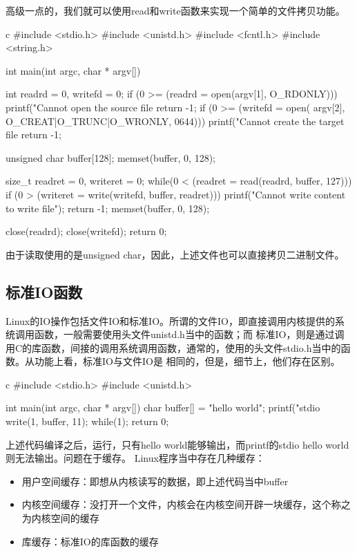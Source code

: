 高级一点的，我们就可以使用read和write函数来实现一个简单的文件拷贝功能。
\begin{code-block}{c}
#include <stdio.h>
#include <unistd.h>
#include <fcntl.h>
#include <string.h>

int main(int argc, char * argv[])
{
        int readrd = 0, writefd = 0;
        if (0 >= (readrd = open(argv[1], O_RDONLY)))
        {
                printf("Cannot open the source file %
                return -1;
        }
        if (0 >= (writefd = open(
                argv[2], O_CREAT|O_TRUNC|O_WRONLY, 0644)))
        {
                printf("Cannot create the target file %
                return -1;
        }

        unsigned char buffer[128];
        memset(buffer, 0, 128);

        size_t readret = 0, writeret = 0;
        while(0 < (readret = read(readrd, buffer, 127)))
        {
                if (0 > (writeret = write(writefd, buffer, readret)))
                {
                        printf("Cannot write content to write file\n");
                        return -1;
                }
                memset(buffer, 0, 128);
        }

        close(readrd);
        close(writefd);
        return 0;
}
\end{code-block}

由于读取使用的是unsigned char，因此，上述文件也可以直接拷贝二进制文件。

\subsection{标准IO函数}
Linux的IO操作包括文件IO和标准IO。所谓的文件IO，即直接调用内核提供的系统调用函数，一般需要使用头文件unistd.h当中的函数；而
标准IO，则是通过调用C的库函数，间接的调用系统调用函数，通常的，使用的头文件stdio.h当中的函数。从功能上看，标准IO与文件IO是
相同的，但是，细节上，他们存在区别。
\begin{code-block}{c}
#include <stdio.h>
#include <unistd.h>

int main(int argc, char * argv[])
{
        char  buffer[] = "hello world";
        printf("stdio %
        write(1, buffer, 11);
        while(1);
        return 0;
}
\end{code-block}

上述代码编译之后，运行，只有hello world能够输出，而printf的stdio hello world则无法输出。问题在于缓存。
Linux程序当中存在几种缓存：
\begin{itemize}
  \item 用户空间缓存：即想从内核读写的数据，即上述代码当中buffer
  \item 内核空间缓存：没打开一个文件，内核会在内核空间开辟一块缓存，这个称之为内核空间的缓存
  \item 库缓存：标准IO的库函数的缓存
\end{itemize}

